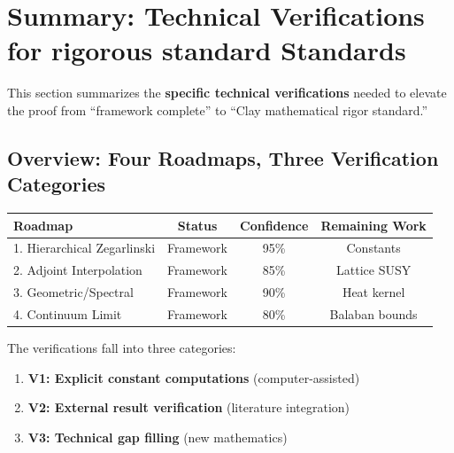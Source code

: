 \section{Summary: Technical Verifications for rigorous standard Standards}
\label{sec:technical-verifications}

This section summarizes the \textbf{specific technical verifications} needed 
to elevate the proof from ``framework complete'' to ``Clay mathematical rigor 
standard.''

\subsection{Overview: Four Roadmaps, Three Verification Categories}

\begin{center}
\begin{tabular}{|l|c|c|c|}
\hline
\textbf{Roadmap} & \textbf{Status} & \textbf{Confidence} & \textbf{Remaining Work} \\
\hline
1. Hierarchical Zegarlinski & Framework & 95\% & Constants \\
2. Adjoint Interpolation & Framework & 85\% & Lattice SUSY \\
3. Geometric/Spectral & Framework & 90\% & Heat kernel \\
4. Continuum Limit & Framework & 80\% & Balaban bounds \\
\hline
\end{tabular}
\end{center}

The verifications fall into three categories:
\begin{enumerate}
\item \textbf{V1: Explicit constant computations} (computer-assisted)
\item \textbf{V2: External result verification} (literature integration)
\item \textbf{V3: Technical gap filling} (new mathematics)
\end{enumerate}

